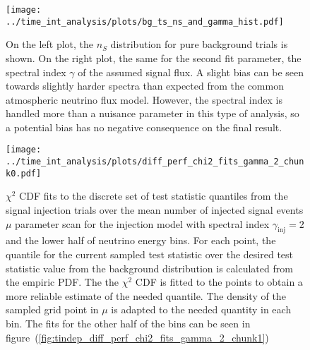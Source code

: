 \begin{figure}[H]
  \centering
  \texttt{[image: ../time\_int\_analysis/plots/bg\_ts\_ns\_and\_gamma\_hist.pdf]}
  \caption[Signal strength and spectral index distribution for background trials]{
    On the left plot, the $n_S$ distribution for pure background trials is shown.
    On the right plot, the same for the second fit parameter, the spectral index $\gamma$ of the assumed signal flux.
    A slight bias can be seen towards slightly harder spectra than expected from the common atmospheric neutrino flux model.
    However, the spectral index is handled more than a nuisance parameter in this type of analysis, so a potential bias has no negative consequence on the final result.
  }
  \label{fig:bg_ts_ns_and_gamma_hist}
\end{figure}

\begin{figure}[H]
  \centering
  \texttt{[image: ../time\_int\_analysis/plots/diff\_perf\_chi2\_fits\_gamma\_2\_chunk0.pdf]}
  \caption[$\chi^2$ CDF fits for the time-integrated diff. performance, $\gamma_\text{inj}=2$ -- part 1]{
     $\chi^2$ CDF fits to the discrete set of test statistic quantiles from the signal injection trials over the mean number of injected signal events $\mu$ parameter scan for the injection model with spectral index $\gamma_\text{inj}=2$ and the lower half of neutrino energy bins.
     For each point, the quantile for the current sampled test statistic over the desired test statistic value from the background distribution is calculated from the empiric PDF.
     The the $\chi^2$ CDF is fitted to the points to obtain a more reliable estimate of the needed quantile.
     The density of the sampled grid point in $\mu$ is adapted to the needed quantity in each bin.
     The fits for the other half of the bins can be seen in figure~(\ref{fig:tindep_diff_perf_chi2_fits_gamma_2_chunk1})
  }
  \label{fig:tindep_diff_perf_chi2_fits_gamma_2_chunk0}
\end{figure}

